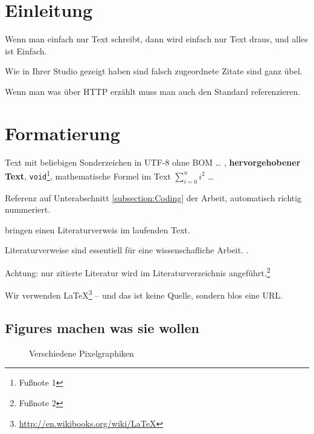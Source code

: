 \section{Einleitung}
\label{section:Introduction}

Wenn man einfach nur Text schreibt, dann wird
einfach nur Text draus, und alles ist Einfach.

Wie \textcite[]{Mulloni:2010} in Ihrer Studio gezeigt haben sind falsch zugeordnete Zitate sind ganz übel.

Wenn man was über HTTP erzählt muss man auch den
Standard referenzieren.\autocite[]{RFC2616}

\section{Formatierung}
\label{section:Formatting}


Text mit beliebigen Sonderzeichen in UTF-8 ohne BOM \ldots
,
\textbf{hervorgehobener Text},
\texttt{void}\footnote{Fußnote 1},
mathematische Formel im Text $\sum_{i=0}^n i^2$
\ldots

Referenz auf Unterabschnitt \ref{subsection:Coding} der Arbeit, automatisch richtig nummeriert.

\textcite[]{Mulloni:2010} bringen einen Literaturverweis im laufenden Text.

Literaturverweise sind essentiell für eine wissenschafliche Arbeit. \autocite[]{McConnell:2004:CCS:1096143}.

Achtung: nur zitierte Literatur wird im Literaturverzeichnis
angeführt.\footnote{Fußnote 2}


Wir verwenden \LaTeX\footnote{ \url{http://en.wikibooks.org/wiki/LaTeX}} -- und das
ist keine Quelle, sondern blos eine URL.

\subsection{Figures machen was sie wollen}

\begin{figure}[!ht]
	\centering
	\qquad
	\caption[
		Verschiedene Pixelgraphiken\newline
		\small\texttt{https://mediacube.at/wiki/}
	]{
		Verschiedene Pixelgraphiken
	}
	\label{figure:PixelImages}
\end{figure}

